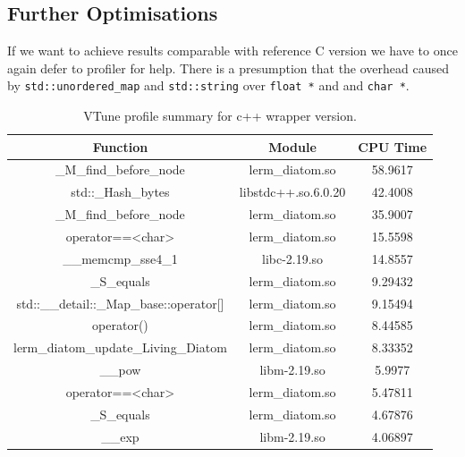 \documentclass[12pt, a4paper]{report}
\begin{document}
\subsection{Further Optimisations}\label{subsec:further-opt}
If we want to achieve results comparable with reference C version we have to once again
defer to profiler for help. There is a presumption that the overhead caused by
\lstinline{std::unordered_map} and \lstinline{std::string} over \lstinline{float *} and
and \lstinline{char *}.

\begin{table}
  \begin{center}
    \begin{tabular}{|c|c||c|}
    \hline
    Function                                 & Module              & CPU Time               \\ \hline
    \rowcolor{babyblue}
    \_M\_find\_before\_node                  & lerm\_diatom.so     & 58.9617 \\
    \rowcolor{babyblue}
    std::\_Hash\_bytes                       & libstdc++.so.6.0.20 & 42.4008  \\
    \rowcolor{babyblue}
    \_M\_find\_before\_node                  & lerm\_diatom.so     & 35.9007 \\
    \rowcolor{babyblue}
    operator==\textless char\textgreater     & lerm\_diatom.so     & 15.5598 \\
    \rowcolor{babyblue}
    \_\_memcmp\_sse4\_1                      & libc-2.19.so        & 14.8557         \\
    \rowcolor{babyblue}
    \_S\_equals                              & lerm\_diatom.so     & 9.29432 \\
    \rowcolor{babyblue}
    std::\_\_detail::\_Map\_base::operator[] & lerm\_diatom.so     & 9.15494 \\
    \rowcolor{babyblue}
    operator()                               & lerm\_diatom.so     & 8.44585 \\
    lerm\_diatom\_update\_Living\_Diatom     & lerm\_diatom.so     & 8.33352 \\
    \_\_pow                                  & libm-2.19.so        & 5.9977          \\
    \rowcolor{babyblue}
    operator==\textless char\textgreater     & lerm\_diatom.so     & 5.47811 \\
    \rowcolor{babyblue}
    \_S\_equals                              & lerm\_diatom.so     & 4.67876 \\
    \_\_exp                                  & libm-2.19.so        & 4.06897       \\ \hline
    \end{tabular}
    \caption {VTune profile summary for c++ wrapper version.}
    \label{table:vtune-gil-free-profile}
  \end{center}
\end{table}
\end{document}
